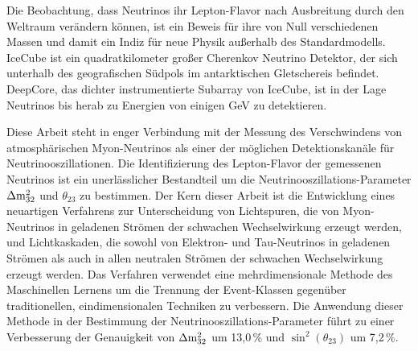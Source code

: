 
Die Beobachtung, dass Neutrinos ihr Lepton-Flavor nach Ausbreitung durch den Weltraum verändern können, ist ein Beweis für ihre von Null verschiedenen Massen und damit ein Indiz f\"ur neue Physik außerhalb des Standardmodells.
IceCube ist ein quadratkilometer großer Cherenkov Neutrino Detektor, der sich unterhalb des geografischen Südpols im antarktischen Gletschereis befindet.
DeepCore, das dichter instrumentierte Subarray von IceCube, ist in der Lage Neutrinos bis herab zu Energien von einigen GeV zu detektieren.

Diese Arbeit steht in enger Verbindung mit der Messung des Verschwindens von atmosphärischen Myon-Neutrinos als einer der möglichen Detektionskanäle für Neutrinooszillationen.
Die Identifizierung des Lepton-Flavor der gemessenen Neutrinos ist ein unerlässlicher Bestandteil um die Neutrinooszillations-Parameter $\Delta \rm{m}^{2}_{32}$ und $\theta_{23}$ zu bestimmen.
Der Kern dieser Arbeit ist die Entwicklung eines neuartigen Verfahrens zur Unterscheidung von Lichtspuren, die von Myon-Neutrinos in geladenen Strömen der schwachen Wechselwirkung erzeugt werden, und Lichtkaskaden, die sowohl von Elektron- und Tau-Neutrinos in geladenen Strömen als auch in allen neutralen Strömen der schwachen Wechselwirkung erzeugt werden.
Das Verfahren verwendet eine mehrdimensionale Methode des Maschinellen Lernens um die Trennung der Event-Klassen gegenüber traditionellen, eindimensionalen Techniken zu verbessern.
Die Anwendung dieser Methode in der Bestimmung der Neutrinooszillations-Parameter führt zu einer Verbesserung der Genauigkeit von $\Delta\rm{m}^{2}_{32}$ um 13,0\,\% und $\sin^{2}(\theta_{23})$ um 7,2\,\%.

